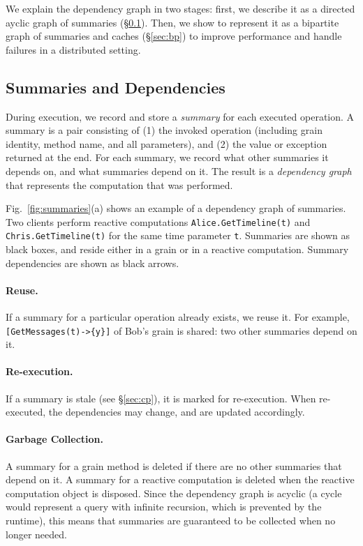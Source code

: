 We explain the dependency graph in two stages: first, we describe it as a directed ayclic graph of summaries (\S\ref{sec:summaries}). Then, we show to represent it as a bipartite graph of summaries and caches (\S\ref{sec:bp}) to improve performance and handle failures in a distributed setting. 

\subsection{Summaries and Dependencies}\label{sec:summaries}

During execution, we record and store a \emph{summary} for each executed operation. A summary is a pair consisting of (1) the invoked operation (including grain identity, method name, and all parameters), and (2) the value or exception returned at the end. For each summary, we record what other summaries it depends on, and what summaries depend on it. The result is a \emph{dependency graph} that represents the computation that was performed.

Fig.~\ref{fig:summaries}(a) shows an example of a dependency graph of summaries. Two clients perform reactive computations \lstinline|Alice.GetTimeline(t)| and \lstinline|Chris.GetTimeline(t)| for the same time parameter \lstinline|t|. Summaries are shown as black boxes, and reside either in a grain or in a reactive computation. Summary dependencies are shown as black arrows.

\paragraph{Reuse.} If a summary for a particular operation already exists, we reuse it. For example, \lstinline|[GetMessages(t)->{y}]| of Bob's grain is shared: two other summaries depend on it. 

\paragraph{Re-execution.} If a summary is stale (see \S\ref{sec:cp}), it is marked for re-execution. When re-executed, the dependencies may change, and are updated accordingly. 

\paragraph{Garbage Collection.} A summary for a grain method is deleted if there are no other summaries that depend on it.  A summary for a reactive computation is deleted when the reactive computation object is disposed. Since the dependency graph is acyclic (a cycle would represent a query with infinite recursion, which is prevented by the runtime), this means that summaries are guaranteed to be collected when no longer needed.  

